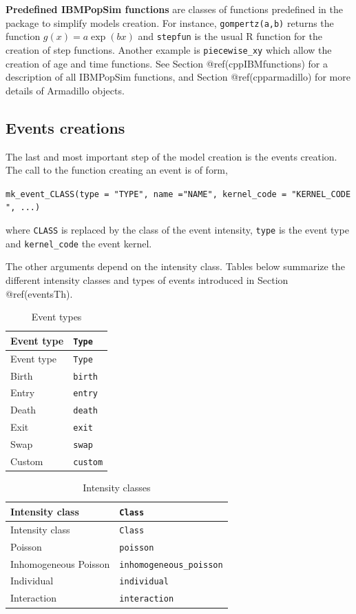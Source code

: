 \textbf{Predefined IBMPopSim functions} are classes of functions predefined in the package to simplify models creation. For instance, \texttt{gompertz(a,b)} returns the function \(g(x) = a \exp(bx)\) and \texttt{stepfun} is the usual R function for the creation of step functions. Another example is \texttt{piecewise\_xy} which allow the creation of age and time functions. See Section @ref(cppIBMfunctions) for a description of all IBMPopSim functions, and Section @ref(cpparmadillo) for more details of Armadillo objects.

\hypertarget{events}{%
\subsection{Events creations}\label{events}}

The last and most important step of the model creation is the events creation. The call to the function creating an event is of form,

\texttt{mk\_event\_CLASS(type\ =\ "TYPE",\ name\ ="NAME",\ kernel\_code\ =\ "KERNEL\_CODE",\ ...)}

where \texttt{CLASS} is replaced by the class of the event intensity, \texttt{type} is the event type and \texttt{kernel\_code} the event kernel.

The other arguments depend on the intensity class. Tables below summarize the different intensity classes and types of events introduced in Section @ref(eventsTh).

\begin{longtable}[]{@{}ll@{}}
\caption{Event types}\tabularnewline
\toprule()
Event type & \texttt{Type} \\
\midrule()
\endfirsthead
\toprule()
Event type & \texttt{Type} \\
\midrule()
\endhead
Birth & \texttt{birth} \\
Entry & \texttt{entry} \\
Death & \texttt{death} \\
Exit & \texttt{exit} \\
Swap & \texttt{swap} \\
Custom & \texttt{custom} \\
\bottomrule()
\end{longtable}

\begin{longtable}[]{@{}ll@{}}
\caption{Intensity classes}\tabularnewline
\toprule()
Intensity class & \texttt{Class} \\
\midrule()
\endfirsthead
\toprule()
Intensity class & \texttt{Class} \\
\midrule()
\endhead
Poisson & \texttt{poisson} \\
Inhomogeneous Poisson & \texttt{inhomogeneous\_poisson} \\
Individual & \texttt{individual} \\
Interaction & \texttt{interaction} \\
\bottomrule()
\end{longtable}


